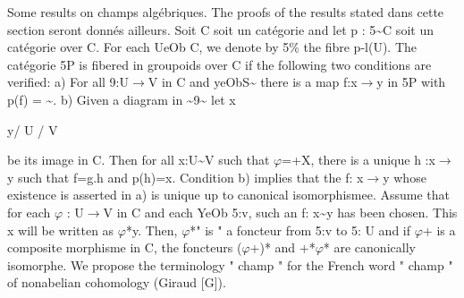 \documentclass[11pt]{article}
\theoremstyle{plain}
\theoremstyle{definition}
\theoremstyle{remark}
\begin{document}
 Some results on champs alg\'ebriques. The proofs of the results stated dans cette section seront donn\'es ailleurs. Soit C soit un cat\'egorie and let p : 5\textasciitilde{}C soit un cat\'egorie over C. For each UeOb C, we denote by 5\% the fibre p-l(U). The cat\'egorie 5P is fibered in groupoids over C if the following two conditions are verified: a) For all 9:U$\to$V in C and yeObS\textasciitilde{} there is a map f:x$\to$y in 5P with p(f) = \textasciitilde{}. b) Given a diagram in \textasciitilde{}9\textasciitilde{} let x

y/ U / V

be its image in C. Then for all x:U\textasciitilde{}V such that $\varphi$=+X, there is a unique h :x$\to$y such that f=g.h and p(h)=x. Condition b) implies that the f: x$\to$y whose existence is asserted in a) is unique up to canonical isomorphismee. Assume that for each $\varphi$ : U$\to$V in C and each YeOb 5:v, such an f: x\textasciitilde{}y has been chosen. This x will be written as $\varphi$*y. Then, $\varphi$*" is " a foncteur from 5:v to 5: U and if $\varphi$+ is a composite morphisme in C, the foncteurs ($\varphi$+)* and +*$\varphi$* are canonically isomorphe. We propose the terminology " champ " for the French word " champ " of nonabelian cohomology (Giraud [G]).
\end{document}
